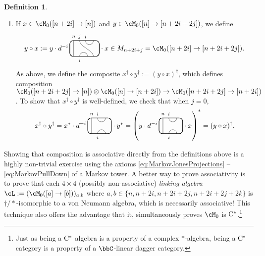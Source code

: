\documentclass[11pt]{article}
\theoremstyle{plain}
\theoremstyle{definition}
\newtheorem{defn}[thm]{Definition}
\newcommand{\Cstar}{\rm{C^*}}
\begin{document}
\begin{defn}
\begin{itemize}
\begin{enumerate}[label={\rm(C\arabic*)}]
\item
\label{compose:downup}
If $x\in \cM_0([n+2i] \to [n])$ and $y\in \cM_0([n] \to [n+2i+2j])$, we define
$$
y\circ x 
:=
y\cdot
d^{-i}\,
\begin{tikzpicture}[baseline = .3cm]
	\draw[thick, rounded corners = 5pt] (0,0) rectangle (1.5,.8);
	\draw (.2,0) -- (.2,.8);
	\draw (.8,.8) arc (-180:0:.2cm);
	\draw (1.2,0) .. controls ++(90:.3cm) and ++(270:.3cm) .. (.5,.8);
	\draw (.5,0) arc (180:0:.2cm);
	\node at (.2,1) {\scriptsize{$n$}};
	\node at (.5,1) {\scriptsize{$j$}};
	\node at (.8,1) {\scriptsize{$i$}};
	\node at (.5,-.2) {\scriptsize{$i$}};
\end{tikzpicture}
\cdot x
\in
M_{n+2i+j}
=
\cM_0([n+2i] \to [n+2i+2j]).
$$
As above, we define the composite $x^\dag \circ y^\dag := (y\circ x)^\dag$, which defines composition
$\cM_0([n+2i+2j] \to [n]) \otimes \cM_0([n] \to [n+2i]) \to \cM_0([n+2i+2j] \to [n+2i])$.
To show that $x^\dag \circ y^\dag$ is well-defined, we check that when $j=0$, 
\begin{equation}
\label{eq:n+2j to n to n+2j}
x^\dag \circ y^\dag 
=
x^* \cdot
d^{-i}\,
\begin{tikzpicture}[baseline = .3cm]
	\draw[thick, rounded corners = 5pt] (0,0) rectangle (1.2,.8);
	\draw (.2,0) -- (.2,.8);
	\draw (.5,.8) arc (-180:0:.2cm);
	\draw (.5,0) arc (180:0:.2cm);
	\node at (.2,1) {\scriptsize{$n$}};
	\node at (.5,1) {\scriptsize{$i$}};
	\node at (.5,-.2) {\scriptsize{$i$}};
\end{tikzpicture}
\cdot y^*
=
\left(
y \cdot
d^{-i}\,
\begin{tikzpicture}[baseline = .3cm]
	\draw[thick, rounded corners = 5pt] (0,0) rectangle (1.2,.8);
	\draw (.2,0) -- (.2,.8);
	\draw (.5,.8) arc (-180:0:.2cm);
	\draw (.5,0) arc (180:0:.2cm);
	\node at (.2,1) {\scriptsize{$n$}};
	\node at (.5,1) {\scriptsize{$i$}};
	\node at (.5,-.2) {\scriptsize{$i$}};
\end{tikzpicture}
\cdot x
\right)^*
=
(y\circ x)^\dag.
\end{equation}
\end{enumerate}
\end{itemize}
Showing that composition is associative directly from the definitions above is a highly non-trivial exercise using the axioms \ref{eq:MarkovJonesProjections} -- \ref{eq:MarkovPullDown} of a Markov tower.
A better way to prove associativity is to prove that each $4\times 4$ (possibly non-associative) \emph{linking algebra} \cite{MR808930} 
$\cL:=(\cM_0([a] \to[b]))_{a,b}$ where $a,b\in \{n, n+2i, n+2i+2j, n+2i+2j+2k \}$
is $\dag/*$-isomorphic to a von Neumann algebra, which is necessarily associative!
This technique also offers the advantage that it, simultaneously proves $\cM_0$ is $\Cstar$.\footnote{
Just as being a $\Cstar$ algebra is a property of a complex $*$-algebra, being a $\Cstar$ category is a property of a $\bbC$-linear dagger category.
}


\end{defn}
\end{document}
